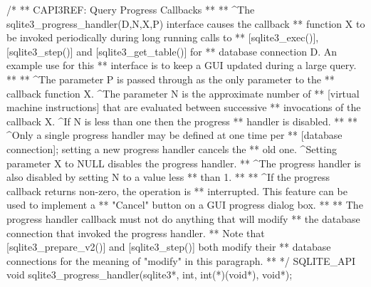 \begin{Codex}[label=sqlite3.h,numbers=left]
{/*
** CAPI3REF: Query Progress Callbacks
**
** ^The sqlite3_progress_handler(D,N,X,P) interface causes the callback
** function X to be invoked periodically during long running calls to
** [sqlite3_exec()], [sqlite3_step()] and [sqlite3_get_table()] for
** database connection D.  An example use for this
** interface is to keep a GUI updated during a large query.
**
** ^The parameter P is passed through as the only parameter to the 
** callback function X.  ^The parameter N is the approximate number of 
** [virtual machine instructions] that are evaluated between successive
** invocations of the callback X.  ^If N is less than one then the progress
** handler is disabled.
**
** ^Only a single progress handler may be defined at one time per
** [database connection]; setting a new progress handler cancels the
** old one.  ^Setting parameter X to NULL disables the progress handler.
** ^The progress handler is also disabled by setting N to a value less
** than 1.
**
** ^If the progress callback returns non-zero, the operation is
** interrupted.  This feature can be used to implement a
** "Cancel" button on a GUI progress dialog box.
**
** The progress handler callback must not do anything that will modify
** the database connection that invoked the progress handler.
** Note that [sqlite3_prepare_v2()] and [sqlite3_step()] both modify their
** database connections for the meaning of "modify" in this paragraph.
**
*/
SQLITE_API void sqlite3_progress_handler(sqlite3*, int, int(*)(void*), void*);

}
\end{Codex}
